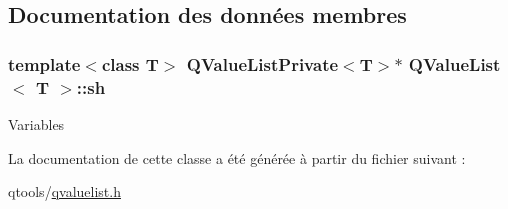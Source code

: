 \subsection{Documentation des données membres}
\hypertarget{class_q_value_list_a98d0ae49f314645c094e61a1d2c1264c}{}
\subsubsection[{sh}]{\setlength{\rightskip}{0pt plus 5cm}template$<$class T$>$ {\bf Q\+Value\+List\+Private}$<$T$>$$\ast$ {\bf Q\+Value\+List}$<$ T $>$\+::sh\hspace{0.3cm}{\ttfamily [protected]}}\label{class_q_value_list_a98d0ae49f314645c094e61a1d2c1264c}
Variables 

La documentation de cette classe a été générée à partir du fichier suivant \+:\begin{DoxyCompactItemize}
\item 
qtools/\hyperlink{qvaluelist_8h}{qvaluelist.\+h}\end{DoxyCompactItemize}

